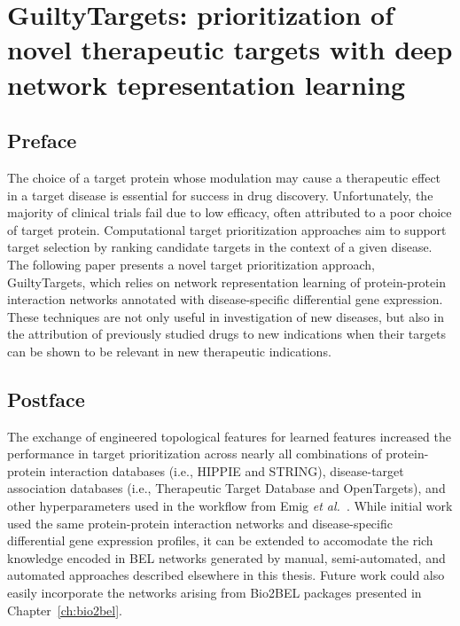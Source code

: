 \chapter{GuiltyTargets: prioritization of novel therapeutic targets with deep network tepresentation learning}
\label{ch:guiltytargets}

\section*{Preface}

The choice of a target protein whose modulation may cause a therapeutic effect in a target disease is essential for success in drug discovery.
Unfortunately, the majority of clinical trials fail due to low efficacy, often attributed to a poor choice of target protein.
Computational target prioritization approaches aim to support target selection by ranking candidate targets in the context of a given disease.
The following paper presents a novel target prioritization approach, GuiltyTargets, which relies on network representation learning of protein-protein interaction networks annotated with disease-specific differential gene expression.
These techniques are not only useful in investigation of new diseases, but also in the attribution of previously studied drugs to new indications when their targets can be shown to be relevant in new therapeutic indications.

\vspace*{\fill}



\section*{Postface}

The exchange of engineered topological features for learned features increased the performance in target prioritization across nearly all combinations of protein-protein interaction databases (i.e., HIPPIE and STRING), disease-target association databases (i.e., Therapeutic Target Database and OpenTargets), and other hyperparameters used in the workflow from Emig \textit{et al.}~\cite{Emig2013}.
While initial work used the same protein-protein interaction networks and disease-specific differential gene expression profiles, it can be extended to accomodate the rich knowledge encoded in \ac{BEL} networks generated by manual, semi-automated, and automated approaches described elsewhere in this thesis.
Future work could also easily incorporate the networks arising from Bio2BEL packages presented in Chapter~\ref{ch:bio2bel}.